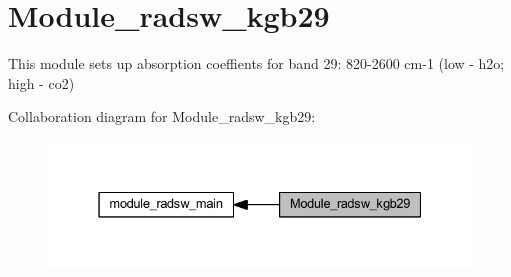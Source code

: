 \hypertarget{group__module__radsw__kgb29}{}\section{Module\+\_\+radsw\+\_\+kgb29}
\label{group__module__radsw__kgb29}


This module sets up absorption coeffients for band 29\+: 820-\/2600 cm-\/1 (low -\/ h2o; high -\/ co2)  


Collaboration diagram for Module\+\_\+radsw\+\_\+kgb29\+:\nopagebreak
\begin{figure}[H]
\begin{center}
\leavevmode
\includegraphics[width=331pt]{group__module__radsw__kgb29}
\end{center}
\end{figure}
